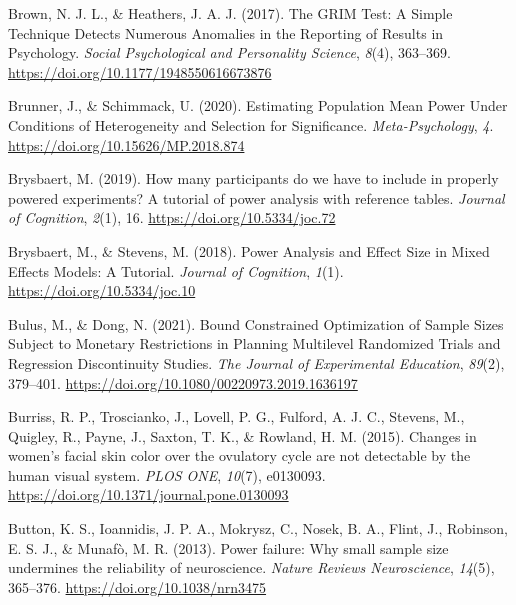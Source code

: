 \documentclass[
  letterpaper,
  DIV=11,
  numbers=noendperiod]{scrreprt}
\newlength{\cslhangindent}
\newlength{\cslentryspacingunit} %
\newenvironment{CSLReferences}[2] %
 {%
  \setlength{\parindent}{0pt}
  \ifodd #1
  \let\oldpar\par
  \def\par{\hangindent=\cslhangindent\oldpar}
  \fi
  \setlength{\parskip}{#2\cslentryspacingunit}
 }%
 {}
\begin{document}
\begin{CSLReferences}{1}{0}
\leavevmode{}%
Brown, N. J. L., \& Heathers, J. A. J. (2017). The {GRIM Test}: {A
Simple Technique Detects Numerous Anomalies} in the {Reporting} of
{Results} in {Psychology}. \emph{Social Psychological and Personality
Science}, \emph{8}(4), 363--369.
\url{https://doi.org/10.1177/1948550616673876}

\leavevmode{}%
Brunner, J., \& Schimmack, U. (2020). Estimating {Population Mean Power
Under Conditions} of {Heterogeneity} and {Selection} for {Significance}.
\emph{Meta-Psychology}, \emph{4}.
\url{https://doi.org/10.15626/MP.2018.874}

\leavevmode{}%
Brysbaert, M. (2019). How many participants do we have to include in
properly powered experiments? {A} tutorial of power analysis with
reference tables. \emph{Journal of Cognition}, \emph{2}(1), 16.
\url{https://doi.org/10.5334/joc.72}

\leavevmode{}%
Brysbaert, M., \& Stevens, M. (2018). Power {Analysis} and {Effect Size}
in {Mixed Effects Models}: {A Tutorial}. \emph{Journal of Cognition},
\emph{1}(1). \url{https://doi.org/10.5334/joc.10}

\leavevmode{}%
Bulus, M., \& Dong, N. (2021). Bound {Constrained Optimization} of
{Sample Sizes Subject} to {Monetary Restrictions} in {Planning
Multilevel Randomized Trials} and {Regression Discontinuity Studies}.
\emph{The Journal of Experimental Education}, \emph{89}(2), 379--401.
\url{https://doi.org/10.1080/00220973.2019.1636197}

\leavevmode{}%
Burriss, R. P., Troscianko, J., Lovell, P. G., Fulford, A. J. C.,
Stevens, M., Quigley, R., Payne, J., Saxton, T. K., \& Rowland, H. M.
(2015). Changes in women's facial skin color over the ovulatory cycle
are not detectable by the human visual system. \emph{PLOS ONE},
\emph{10}(7), e0130093.
\url{https://doi.org/10.1371/journal.pone.0130093}

\leavevmode{}%
Button, K. S., Ioannidis, J. P. A., Mokrysz, C., Nosek, B. A., Flint,
J., Robinson, E. S. J., \& Munafò, M. R. (2013). Power failure: Why
small sample size undermines the reliability of neuroscience.
\emph{Nature Reviews Neuroscience}, \emph{14}(5), 365--376.
\url{https://doi.org/10.1038/nrn3475}


\end{CSLReferences}
\end{document}
